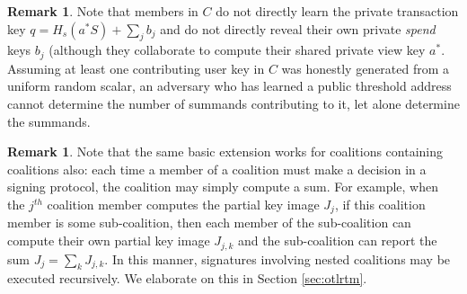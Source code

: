 \documentclass{mrl}
\theoremstyle{definition}
\newtheorem{disc}[theorem]{Remark}
\begin{document}
\begin{disc}
Note that members in $C$ do not directly learn the private transaction key $q=H_s(a^* S)+\sum_j b_j$ and do not directly reveal their own private \textit{spend} keys $b_j$ (although they collaborate to compute their shared private view key $a^*$. Assuming at least one contributing user key in $C$ was honestly generated from a uniform random scalar, an adversary who has learned a public threshold address cannot determine the number of summands contributing to it, let alone determine the summands.  \end{disc}

\begin{disc}\label{remark:recursion}
Note that the same basic extension works for coalitions containing coalitions also: each time a member of a coalition must make a decision in a signing protocol, the coalition may simply compute a sum. For example, when the $j^{th}$ coalition member computes the partial key image $J_j$, if this coalition member is some sub-coalition, then each member of the sub-coalition can compute their own partial key image $J_{j,k}$ and the sub-coalition can report the sum $J_j = \sum_k J_{j,k}$. In this manner, signatures involving nested coalitions may be executed recursively. We elaborate on this in Section \ref{sec:otlrtm}.
\end{disc}
\end{document}
